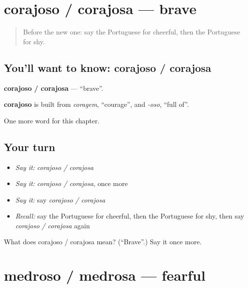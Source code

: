 \section[corajoso / corajosa]{corajoso / corajosa — brave}

\label{lesson:PT-C185-corajoso-corajosa}



\begin{quote}
Before the new one: say the Portuguese for cheerful, then the Portuguese for shy.
\end{quote}

\subsection*{You'll want to know: corajoso / corajosa}
\textbf{corajoso / corajosa} — \textquotedblleft{}brave\textquotedblright{}.

\begin{cousinweb}
\textbf{corajoso} is built from \emph{coragem}, \textquotedblleft{}courage\textquotedblright{}, and \emph{-oso}, \textquotedblleft{}full of\textquotedblright{}.
\end{cousinweb}

\begin{grammarlens}[title={What you've built}]
One more word for this chapter.
\end{grammarlens}

\subsection*{Your turn}
\begin{itemize}
\raggedright
  \item \emph{Say it:} \emph{corajoso / corajosa}
  \item \emph{Say it:} \emph{corajoso / corajosa}, once more
  \item \emph{Say it:} say \emph{corajoso / corajosa}
  \item \emph{Recall:} say the Portuguese for cheerful, then the Portuguese for shy, then say \emph{corajoso / corajosa} again
\end{itemize}

\begin{tcolorbox}[breakable,colback=teal!4,colframe=teal!35!black,title={Before you move on}]
What does corajoso / corajosa mean? (\textquotedblleft{}Brave\textquotedblright{}.) Say it once more.
\end{tcolorbox}
\section[medroso / medrosa]{medroso / medrosa — fearful}

